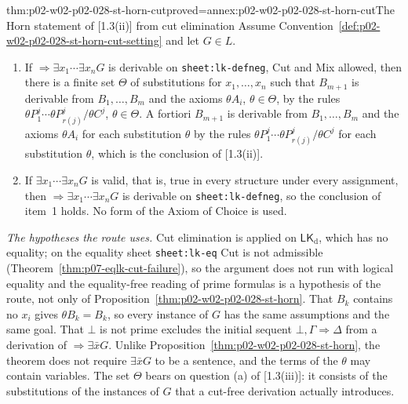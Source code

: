 \begin{hbtheorem}{thm:p02-w02-p02-028-st-horn-cut}{proved=annex:p02-w02-p02-028-st-horn-cut}{The Horn statement of [1.3(ii)] from cut elimination}
Assume Convention~\ref{def:p02-w02-p02-028-st-horn-cut-setting} and let
\(G\in L\).
\begin{enumerate}
  \item If \(\Rightarrow\exists x_1\cdots\exists x_nG\) is derivable on
        \texttt{sheet:lk-defneg}, Cut and Mix
        allowed, then there is a finite set \(\Theta\) of substitutions for
        \(x_1,\ldots,x_n\) such that \(B_{m+1}\) is derivable from
        \(B_1,\ldots,B_m\) and the axioms \(\theta A_i\),
        \(\theta\in\Theta\), by the rules
        \(\theta P^j_1\cdots\theta P^j_{r(j)}/\theta C^j\),
        \(\theta\in\Theta\).  A fortiori \(B_{m+1}\) is derivable from
        \(B_1,\ldots,B_m\) and the axioms \(\theta A_i\) for each
        substitution \(\theta\) by the rules
        \(\theta P^j_1\cdots\theta P^j_{r(j)}/\theta C^j\) for each
        substitution \(\theta\), which is the conclusion of [1.3(ii)].
  \item If \(\exists x_1\cdots\exists x_nG\) is valid, that is, true in
        every structure under every assignment, then
        \(\Rightarrow\exists x_1\cdots\exists x_nG\) is derivable on
        \texttt{sheet:lk-defneg}, so the
        conclusion of item~1 holds.  No form of the Axiom of Choice is used.
\end{enumerate}
\end{hbtheorem}

\emph{The hypotheses the route uses.}  Cut elimination is applied on
\(\mathsf{LK}_{\mathrm d}\), which has no equality; on the equality sheet
\texttt{sheet:lk-eq} Cut is not admissible
(Theorem~\ref{thm:p07-eqlk-cut-failure}), so the argument does not run with
logical equality and the equality-free reading of prime formulas is a
hypothesis of the route, not only of
Proposition~\ref{thm:p02-w02-p02-028-st-horn}.  That \(B_k\) contains no
\(x_i\) gives \(\theta B_k=B_k\), so every instance of \(G\) has the same
assumptions and the same goal.  That \(\bot\) is not prime excludes the
initial sequent \(\bot,\Gamma\Rightarrow\Delta\) from a derivation of
\(\Rightarrow\exists\bar xG\).  Unlike
Proposition~\ref{thm:p02-w02-p02-028-st-horn}, the theorem does not require
\(\exists\bar xG\) to be a sentence, and the terms of the \(\theta\) may
contain variables.  The set \(\Theta\) bears on question (a) of [1.3(iii)]:
it consists of the substitutions of the instances of \(G\) that a cut-free
derivation actually introduces.

